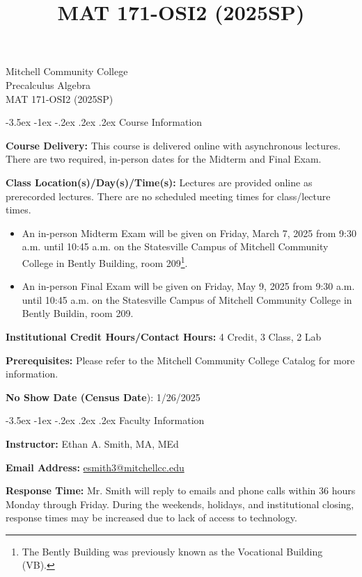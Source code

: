 \documentclass{article}
\title{MAT 171-OSI2 (2025SP)}
\makeatletter
\renewcommand\section{\@startsection{section}{1}{0pt}%
  {-3.5ex \@plus -1ex \@minus -.2ex}%
  {.2ex \@plus.2ex}%
  {\normalfont\Large\bfseries}} %
\makeatother
\begin{document}
\begin{center}
    {\huge Mitchell Community College} \\[6pt]
    {\Large Precalculus Algebra} \\[6pt]
    {\Large MAT 171-OSI2 (2025SP)}
\end{center}

\section{Course Information}

\textbf{Course Delivery:} This course is delivered online with asynchronous lectures. There are two required, in-person dates for the Midterm and Final Exam.

\textbf{Class Location(s)/Day(s)/Time(s):} Lectures are provided online as prerecorded lectures. There are no scheduled meeting times for class/lecture times.

\begin{itemize}
\item An in-person Midterm Exam will be given on Friday, March 7, 2025 from 9:30 a.m. until 10:45 a.m. on the Statesville Campus of Mitchell Community College in Bently Building, room 209\footnote{The Bently Building was previously known as the Vocational Building (VB).}.
\item An in-person Final Exam will be given on Friday, May 9, 2025 from 9:30 a.m. until 10:45 a.m. on the Statesville Campus of Mitchell Community College in Bently Buildin, room 209.
\end{itemize}

\textbf{Institutional Credit Hours/Contact Hours:} 4 Credit, 3 Class, 2 Lab

\textbf{Prerequisites:} Please refer to the Mitchell Community College Catalog for more information.

\textbf{No Show Date (Census Date}): 1/26/2025

\section{Faculty Information}

\textbf{Instructor:} Ethan A. Smith, MA, MEd

\textbf{Email Address:} \href{mailto:esmith3@mitchellcc.edu}{esmith3@mitchellcc.edu}

\textbf{Response Time:} Mr. Smith will reply to emails and phone calls within 36 hours Monday through Friday. During the weekends, holidays, and institutional closing, response times may be increased due to lack of access to technology.
\end{document}
